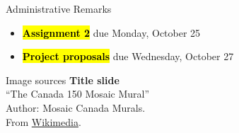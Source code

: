 \documentclass[handout,aspectratio=169]{beamer}
\begin{document}
	\begin{frame}{Administrative Remarks}
	\begin{itemize}
		\item \textbf{\hl{Assignment 2}} due Monday, October 25\\[0.5cm]
		\item \textbf{\hl{Project proposals}} due Wednesday, October 27\\[0.5cm]
	\end{itemize}
	\end{frame}


	\backupbegin

	\begin{frame}[noframenumbering]{Image sources}
		\small
		\textbf{Title slide}\\\enquote{The Canada 150 Mosaic Mural}\\Author: Mosaic Canada Murals.\\From \href{https://commons.wikimedia.org/wiki/File:Canada_150_Mosaic_Engine.jpg}{Wikimedia}.
	\end{frame}


	\backupend
	
\end{document}
